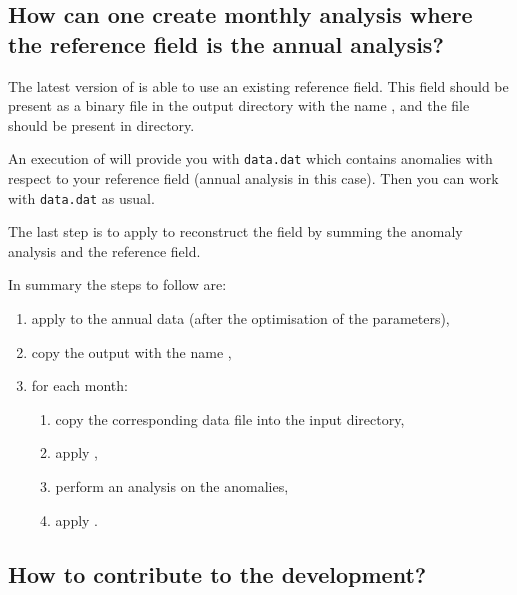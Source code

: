 \subsection{How can one create monthly analysis where the reference field is the annual analysis?}

The latest version of  is able to use an existing reference field. This field should be present as a binary file in the output directory with the name , and the  file should be present in  directory.

An execution of  will provide you with \texttt{data.dat} which contains anomalies with respect to your reference field (annual analysis in this case). Then you can work with \texttt{data.dat} as usual. 

The last step is to apply  to reconstruct the field by summing the anomaly analysis and the reference field.

In summary the steps to follow are:

\begin{enumerate} 
\item apply  to the annual data (after the optimisation of the parameters),
\item copy the output  with the name ,
\item for each month:
\begin{enumerate}
\item copy the corresponding data file into the input directory,
\item apply ,
\item perform an analysis on the anomalies,
\item apply .
\end{enumerate}									 
\end{enumerate}
									 
%
%

\subsection{How to contribute to the development?}


